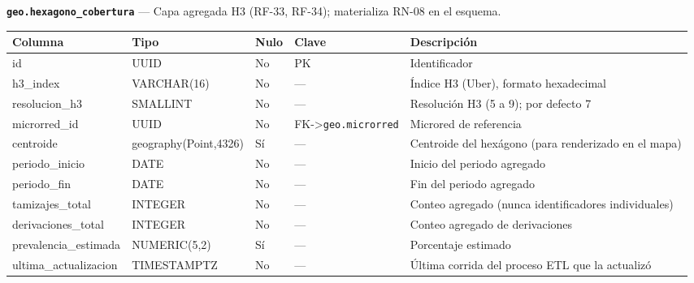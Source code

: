 \documentclass[11pt,a4paper]{article}
\begin{document}
\textbf{\texttt{geo.hexagono\_cobertura}} --- Capa agregada H3 (RF-33, RF-34); materializa RN-08 en el esquema.

{\small
\begin{longtable}[]{@{}
  >{\raggedright\arraybackslash}p{}
  >{\raggedright\arraybackslash}p{}
  >{\raggedright\arraybackslash}p{}
  >{\raggedright\arraybackslash}p{}
  >{\raggedright\arraybackslash}p{}@{}}
\toprule\noalign{}
\begin{minipage}[b]{\linewidth}\raggedright
Columna
\end{minipage} & \begin{minipage}[b]{\linewidth}\raggedright
Tipo
\end{minipage} & \begin{minipage}[b]{\linewidth}\raggedright
Nulo
\end{minipage} & \begin{minipage}[b]{\linewidth}\raggedright
Clave
\end{minipage} & \begin{minipage}[b]{\linewidth}\raggedright
Descripción
\end{minipage} \\
\midrule\noalign{}
\endhead
\bottomrule\noalign{}
\endlastfoot
id & UUID & No & PK & Identificador \\
h3\_index & VARCHAR(16) & No & --- & Índice H3 (Uber), formato hexadecimal \\
resolucion\_h3 & SMALLINT & No & --- & Resolución H3 (5 a 9); por defecto 7 \\
microrred\_id & UUID & No & FK-\textgreater{}\texttt{geo.microrred} & Microred de referencia \\
centroide & geography(Point,4326) & Sí & --- & Centroide del hexágono (para renderizado en el mapa) \\
periodo\_inicio & DATE & No & --- & Inicio del periodo agregado \\
periodo\_fin & DATE & No & --- & Fin del periodo agregado \\
tamizajes\_total & INTEGER & No & --- & Conteo agregado (nunca identificadores individuales) \\
derivaciones\_total & INTEGER & No & --- & Conteo agregado de derivaciones \\
prevalencia\_estimada & NUMERIC(5,2) & Sí & --- & Porcentaje estimado \\
ultima\_actualizacion & TIMESTAMPTZ & No & --- & Última corrida del proceso ETL que la actualizó \\
\end{longtable}
}
\end{document}
